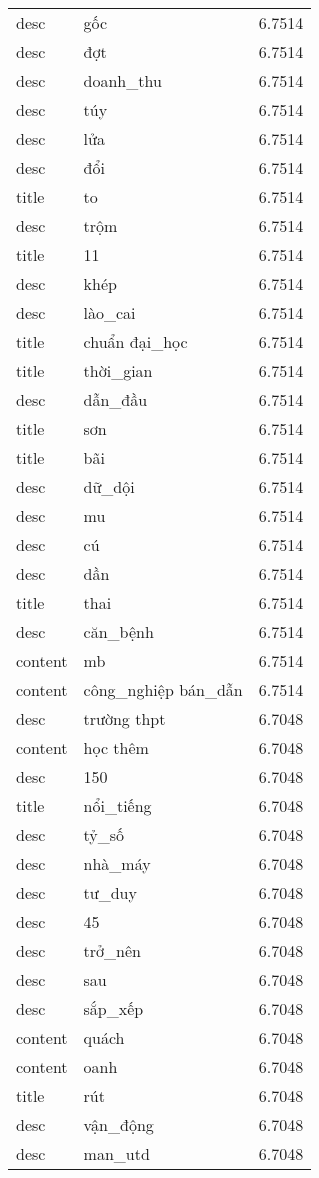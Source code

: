 \documentclass{article}
\begin{document}
\begin{tabular}{lll}
desc & gốc & 6.7514\\
desc & đợt & 6.7514\\
desc & doanh\_thu & 6.7514\\
desc & túy & 6.7514\\
desc & lửa & 6.7514\\
desc & đổi & 6.7514\\
title & to & 6.7514\\
desc & trộm & 6.7514\\
title & 11 & 6.7514\\
desc & khép & 6.7514\\
desc & lào\_cai & 6.7514\\
title & chuẩn đại\_học & 6.7514\\
title & thời\_gian & 6.7514\\
desc & dẫn\_đầu & 6.7514\\
title & sơn & 6.7514\\
title & bãi & 6.7514\\
desc & dữ\_dội & 6.7514\\
desc & mu & 6.7514\\
desc & cú & 6.7514\\
desc & dần & 6.7514\\
title & thai & 6.7514\\
desc & căn\_bệnh & 6.7514\\
content & mb & 6.7514\\
content & công\_nghiệp bán\_dẫn & 6.7514\\
desc & trường thpt & 6.7048\\
content & học thêm & 6.7048\\
desc & 150 & 6.7048\\
title & nổi\_tiếng & 6.7048\\
desc & tỷ\_số & 6.7048\\
desc & nhà\_máy & 6.7048\\
desc & tư\_duy & 6.7048\\
desc & 45 & 6.7048\\
desc & trở\_nên & 6.7048\\
desc & sau & 6.7048\\
desc & sắp\_xếp & 6.7048\\
content & quách & 6.7048\\
content & oanh & 6.7048\\
title & rút & 6.7048\\
desc & vận\_động & 6.7048\\
desc & man\_utd & 6.7048\\

\end{tabular}
\end{document}
